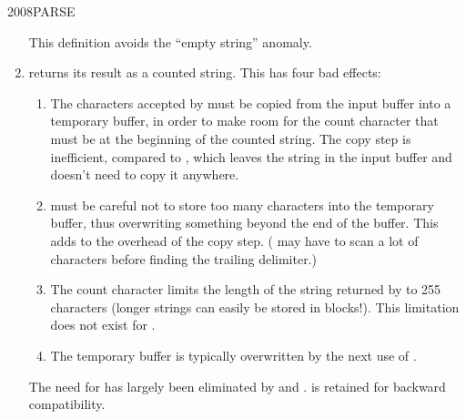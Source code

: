 \begin{worddef}{2008}{PARSE}
\begin{rationale}
\begin{enumerate}
			This definition avoids the ``empty string'' anomaly.

		\item {} returns its result as a counted string.
			This has four bad effects:

			\begin{enumerate}
			\item The characters accepted by  must be
				copied from the input buffer into a temporary buffer,
				in order to make room for the count character that
				must be at the beginning of the counted string. The
				copy step is inefficient, compared to ,
				which leaves the string in the input buffer and doesn't
				need to copy it anywhere.

			\item {} must be careful not to store too many
				characters into the temporary buffer, thus overwriting
				something beyond the end of the buffer. This adds to
				the overhead of the copy step. ( may have
				to scan a lot of characters before finding the trailing
				delimiter.)

			\item The count character limits the length of the string
				returned by  to 255 characters (longer
				strings can easily be stored in blocks!). This
				limitation does not exist for .

			\item The temporary buffer is typically overwritten by the
				next use of .
			\end{enumerate}

			The need for  has largely been eliminated by
			 and .  is
			retained for backward compatibility.
		\end{enumerate}
	\end{rationale}
\end{worddef}


